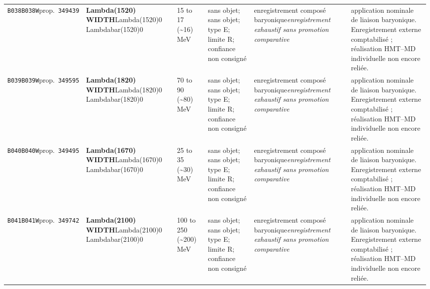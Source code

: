 \begin{landscape}
\begin{longtable}{L{1.85cm}L{4.45cm}L{2.35cm}L{4.05cm}L{3.35cm}L{7.15cm}}
\texttt{B038}\newline \texttt{B038W}\newline prop.\ \texttt{349439} & \textbf{Lambda(1520) WIDTH}\newline Lambda(1520)0 \textbar{}\allowbreak{} Lambdabar(1520)0 & 15 to 17 (\textasciitilde{}16)\,MeV & sans objet; sans objet; type E; limite R; confiance non consigné & enregistrement composé baryonique\newline \emph{enregistrement exhaustif sans promotion comparative} & application nominale de liaison baryonique. Enregistrement externe comptabilisé ; réalisation HMT--MD individuelle non encore reliée. \\
\texttt{B039}\newline \texttt{B039W}\newline prop.\ \texttt{349595} & \textbf{Lambda(1820) WIDTH}\newline Lambda(1820)0 \textbar{}\allowbreak{} Lambdabar(1820)0 & 70 to 90 (\textasciitilde{}80)\,MeV & sans objet; sans objet; type E; limite R; confiance non consigné & enregistrement composé baryonique\newline \emph{enregistrement exhaustif sans promotion comparative} & application nominale de liaison baryonique. Enregistrement externe comptabilisé ; réalisation HMT--MD individuelle non encore reliée. \\
\texttt{B040}\newline \texttt{B040W}\newline prop.\ \texttt{349495} & \textbf{Lambda(1670) WIDTH}\newline Lambda(1670)0 \textbar{}\allowbreak{} Lambdabar(1670)0 & 25 to 35 (\textasciitilde{}30)\,MeV & sans objet; sans objet; type E; limite R; confiance non consigné & enregistrement composé baryonique\newline \emph{enregistrement exhaustif sans promotion comparative} & application nominale de liaison baryonique. Enregistrement externe comptabilisé ; réalisation HMT--MD individuelle non encore reliée. \\
\texttt{B041}\newline \texttt{B041W}\newline prop.\ \texttt{349742} & \textbf{Lambda(2100) WIDTH}\newline Lambda(2100)0 \textbar{}\allowbreak{} Lambdabar(2100)0 & 100 to 250 (\textasciitilde{}200)\,MeV & sans objet; sans objet; type E; limite R; confiance non consigné & enregistrement composé baryonique\newline \emph{enregistrement exhaustif sans promotion comparative} & application nominale de liaison baryonique. Enregistrement externe comptabilisé ; réalisation HMT--MD individuelle non encore reliée. \\

\end{longtable}
\end{landscape}
